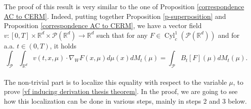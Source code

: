 \documentclass[10pt,leqno]{amsart}
\numberwithin{equation}{section}
\newcommand{\R}{\mathbb{R}}
\newcommand{\PP}{\mathcal{P}}
\begin{document}
The proof of this result is very similar to the one of Proposition \ref{correspondence AC to CERM}. Indeed, putting together Proposition \ref{p-superposition} and Proposition \ref{correspondence AC to CERM}, we have a vector field $v:[0,T]\times \R^d \times \PP(\R^d)\to \R^d$ such that for any $F\in \operatorname{Cyl}_c^1(\PP(\R^d))$ and for a.a. $t\in (0,T)$, it holds 
    \[\int_{\PP}\int_{\R^d} v(t,x,\mu)\cdot \nabla_W F(x,\mu) d\mu(x) dM_t(\mu) = \int_{\PP} B_t[F](\mu) dM_t(\mu).\]
    \\
    The non-trivial part is to localize this equality with respect to the variable $\mu$, to prove \eqref{vf inducing derivation thesis theorem}. In the proof, we are going to see how this localization can be done in various steps, mainly in steps 2 and 3 below.  
    
\end{document}

